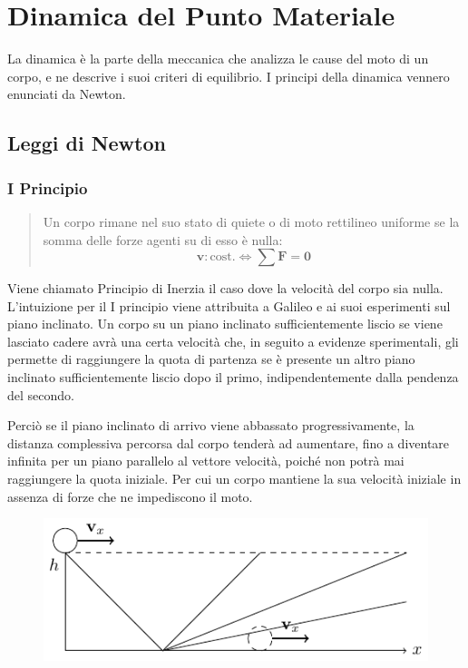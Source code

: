 \documentclass{article}
\newcommand{\vect}[1]{\boldsymbol{\mathbf{#1}}}
\numberwithin{equation}{subsection}
\begin{document}
\section{Dinamica del Punto Materiale}
La dinamica è la parte della meccanica che analizza le cause del moto di un corpo, e ne descrive i suoi criteri di equilibrio. I principi della dinamica vennero 
enunciati da Newton. 

\subsection{Leggi di Newton}

\subsubsection{I Principio}
\begin{quotation}
    Un corpo rimane nel suo stato di quiete o di moto rettilineo 
    uniforme se la somma delle forze agenti su di esso è nulla:
    \begin{equation}
        \vect{v}:\mathrm{cost.}\iff \sum\vect{F}=\vect{0}
    \end{equation}
\end{quotation}
Viene chiamato Principio di Inerzia il caso dove la velocità 
del corpo sia nulla.
L'intuizione per il I principio viene attribuita a Galileo 
e ai suoi esperimenti sul piano inclinato. Un corpo su un piano 
inclinato sufficientemente liscio se viene lasciato cadere 
avrà una certa velocità che, in seguito a evidenze sperimentali,
gli permette di raggiungere la quota di partenza 
se è presente un altro piano inclinato sufficientemente liscio dopo il primo, indipendentemente dalla pendenza del secondo. 


Perciò se il piano inclinato di arrivo viene abbassato 
progressivamente, la distanza complessiva percorsa dal corpo tenderà ad 
aumentare, fino a diventare infinita per un piano parallelo al 
vettore velocità, poiché non potrà mai raggiungere la quota iniziale. 
Per cui un corpo mantiene la sua velocità iniziale 
in assenza di forze che ne impediscono il moto.

\begin{figure}[H]%
    \centering
    \includegraphics{primo-principio.pdf}%
\end{figure}
    
\end{document}
